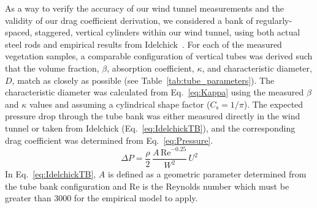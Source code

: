 \documentclass[12pt]{article}
\begin{document}
As a way to verify the accuracy of our wind tunnel measurements and the validity of our drag coefficient derivation, we considered a bank of regularly-spaced, staggered, vertical cylinders within our wind tunnel, using both actual steel rods and empirical results from Idelchick~\cite{Idelchick1994}. For each of the measured vegetation samples, a comparable configuration of vertical tubes was derived such that the volume fraction, $\beta$, absorption coefficient, $\kappa$, and characteristic diameter, $D$, match as closely as possible (see Table~\ref{tab:tube_parameters}). The characteristic diameter was calculated from Eq.~\ref{eq:Kappa} using the measured $\beta$ and $\kappa$ values and assuming a cylindrical shape factor ($C_{\mathrm{s}} = 1/\pi$). The expected pressure drop through the tube bank was either measured directly in the wind tunnel or taken from Idelchick (Eq.~\ref{eq:IdelchickTB}), and the corresponding drag coefficient was determined from Eq.~\ref{eq:Pressure}.
\begin{equation}
\label{eq:IdelchickTB}
\Delta P = \frac{\rho}{2}\,\frac{A\, \mathrm{Re}^{-0.25}}{W^{2}}\, U^2
\end{equation}
In Eq.~\ref{eq:IdelchickTB}, $A$ is defined as a geometric parameter determined from the tube bank configuration and Re is the Reynolds number which must be greater than 3000 for the empirical model to apply.
\end{document}
